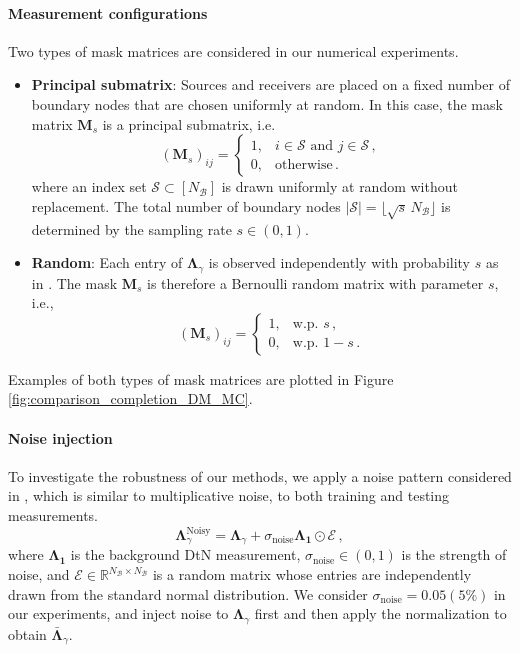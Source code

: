 \documentclass{article}
\begin{document}
\paragraph{Measurement configurations} 
Two types of mask matrices are considered in our numerical experiments.
\begin{itemize}
    \item \textbf{Principal submatrix}: 
    Sources and receivers are placed on a fixed number of boundary nodes that are chosen uniformly at random. In this case, the mask matrix $\mathbf{M}_s$ is a principal submatrix, i.e.
\[
(\mathbf{M}_{s})_{ij} = 
\begin{cases}
1, & i\in\mathcal{S} \text{ and } j\in\mathcal{S}\,,\\[2pt]
0, & \text{otherwise}\,.
\end{cases}
\]
    where an index set $\mathcal{S} \subset [N_{\mathcal B}]$ is drawn uniformly at random without replacement. The total number of boundary nodes $|\mathcal{S}| = \lfloor \sqrt{s}\,N_{\mathcal B}\rfloor$ is determined by the sampling rate $s\in (0,1)$. 
\item \textbf{Random}: Each entry of $\mathbf{\Lambda}_\gamma$ is observed independently with probability $s$ as in \citet{bui2022bridging}. The mask $\mathbf{M}_s$ is therefore a Bernoulli random matrix with parameter $s$, i.e.,
\[
(\mathbf{M}_{s})_{ij} = 
\begin{cases}
1, & \text{w.p. } s\,,\\[2pt]
0, & \text{w.p. } 1-s\,.
\end{cases}
\]
\end{itemize}
 
Examples of both types of mask matrices are plotted in Figure \ref{fig:comparison_completion_DM_MC}.

\paragraph{Noise injection} To investigate the robustness of our methods, we apply a noise pattern considered in \citet{borcea2013study}, which is similar to multiplicative noise, to both training and testing measurements.
\begin{equation*}
    \mathbf{\Lambda}_{\gamma}^{\text{Noisy}} = \mathbf{\Lambda}_{\gamma} + \sigma_\text{noise}\mathbf{\Lambda}_{\textbf{1}}\odot\mathcal{E} \,,
\end{equation*}
where $\mathbf{\Lambda}_{\textbf{1}}$ is the background DtN measurement, $\sigma_\text{noise}\in (0,1)$ is the strength of noise, and $\mathcal{E} \in \mathbb{R}^{N_{\mathcal{B}}\times N_{\mathcal{B}}}$ is a random matrix whose entries are independently drawn from the standard normal distribution. We consider $\sigma_\text{noise}= 0.05 (5\%)$ in our experiments, and inject noise to $\mathbf{\Lambda}_\gamma$ first and then apply the normalization to obtain $\bar{\mathbf{\Lambda}}_\gamma$.
\end{document}
